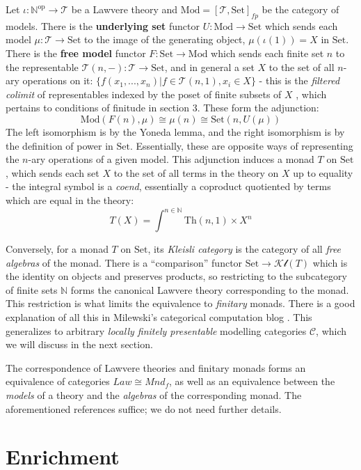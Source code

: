 \documentclass[a4paper,UKenglish]{article}
\newcommand{\Th}{\mathrm{Th}}
\newcommand{\Set}{\mathrm{Set}}
\newcommand{\Mod}{\mathrm{Mod}}
\newcommand{\op}{\mathrm{op}}
\newcommand{\NN}{\mathbb{N}}
\newcommand{\C}{\mathscr{C}}
\newcommand{\T}{\mathscr{T}}
\newcommand{\Kl}{\mathscr{Kl}}
\begin{document}
Let $\iota: \NN^\op \to \T$ be a Lawvere theory and $\Mod = [\T,\Set]_{fp}$ be the category of models. There is the \textbf{underlying set} functor $U:\Mod \to \Set$ which sends each model $\mu: \T \to \Set$ to the image of the generating object, $\mu(\iota(1)) = X$ in $\Set$. There is the \textbf{free model} functor $F:\Set \to \Mod$ which sends each finite set $n$ to the representable $\T(n,-):\T \to \Set$, and in general a set $X$ to the set of all $n$-ary operations on it: $\{f(x_1,...,x_n)|f\in \T(n,1), x_i\in X\}$ - this is the \textit{filtered colimit} of representables indexed by the poset of finite subsets of $X$ \cite{nlab}, which pertains to conditions of finitude in section 3. These form the adjunction: $$\Mod(F(n),\mu) \cong \mu(n) \cong \Set(n,U(\mu))$$ The left isomorphism is by the Yoneda lemma, and the right isomorphism is by the definition of power in $\Set$. Essentially, these are opposite ways of representing the $n$-ary operations of a given model. This adjunction induces a monad $T$ on $\Set$, which sends each set $X$ to the set of all terms in the theory on $X$ up to equality - the integral symbol is a \textit{coend}, essentially a coproduct quotiented by terms which are equal in the theory: $$T(X) = \int^{n\in \NN} \Th(n,1) \times X^n$$

Conversely, for a monad $T$ on $\Set$, its \textit{Kleisli category} is the category of all \textit{free algebras} of the monad. There is a ``comparison'' functor $\Set \to \Kl(T)$ which is the identity on objects and preserves products, so restricting to the subcategory of finite sets $\NN$ forms the canonical Lawvere theory corresponding to the monad. This restriction is what limits the equivalence to \textit{finitary} monads. There is a good explanation of all this in Milewski's categorical computation blog \cite{milew}. This generalizes to arbitrary \textit{locally finitely presentable} modelling categories $\C$, which we will discuss in the next section.

The correspondence of Lawvere theories and finitary monads forms an equivalence of categories $Law \cong Mnd_f$, as well as an equivalence between the \textit{models} of a theory and the \textit{algebras} of the corresponding monad. The aforementioned references suffice; we do not need further details. 

\section{Enrichment}
\end{document}
